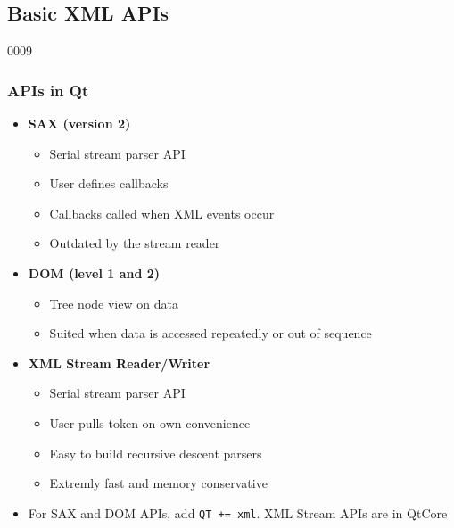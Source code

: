 %
%
%
%

\subsection{Basic XML APIs}


\begin{slide}[fragile]{0009}
\frametitle{ APIs in Qt} \label{xml}
\begin{itemize}
\item \textbf{SAX (version 2)}
  \begin{itemize}
  \item Serial stream parser API
  \item User defines callbacks
  \item Callbacks called when XML events occur
  \item Outdated by the stream reader
  \end{itemize}
\item\textbf{ DOM (level 1 and 2)}
  \begin{itemize}
  \item Tree node view on data
  \item Suited when data is accessed repeatedly or out of sequence 
  \end{itemize}
\item \textbf{XML Stream Reader/Writer}
  \begin{itemize}
  \item Serial stream parser API
  \item User pulls token on own convenience
  \item Easy to build recursive descent parsers
  \item Extremly fast and memory conservative
  \end{itemize}
\item For SAX and DOM APIs, add \verb!QT += xml!. XML Stream APIs are in QtCore
\end{itemize}
\end{slide}

